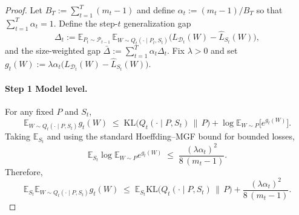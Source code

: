 \documentclass{article}
\theoremstyle{plain}
\theoremstyle{definition}
\theoremstyle{remark}
\begin{document}
\begin{proof}
    


Let $B_T:=\sum_{t=1}^T (m_t-1)$ and define $\alpha_t:=(m_t-1)/B_T$ so that $\sum_{t=1}^T\alpha_t=1$.
Define the step-$t$ generalization gap
\[
\Delta_t
:=\mathbb E_{P_t\sim\mathcal P_{t-1}}\,
\mathbb E_{W\sim Q_t(\cdot\mid P_t,S_t)}
\big(L_{\mathcal D_t}(W)-\hat L_{S_t}(W)\big),
\]
and the size-weighted gap $\bar\Delta:=\sum_{t=1}^T \alpha_t \Delta_t$.
Fix $\lambda>0$ and set
\(
g_t(W):=\lambda\alpha_t\big(L_{\mathcal D_t}(W)-\hat L_{S_t}(W)\big).
\)

\paragraph{Step 1 Model level.}
For any fixed $P$ and $S_t$,
\begin{equation}
\label{eq:dv-w}
\mathbb E_{W\sim Q_t(\cdot\mid P,S_t)} g_t(W)
\;\le\;
\mathrm{KL}\!\big(Q_t(\cdot\mid P,S_t)\,\|\,P\big)
+\log\mathbb E_{W\sim P}\!\big[e^{g_t(W)}\big].
\end{equation}
Taking $\mathbb E_{S_t}$ and using the standard Hoeffding--MGF bound for bounded losses,
\begin{equation}
\label{eq:mgf-mean-gap}
\mathbb E_{S_t}\log\mathbb E_{W\sim P} e^{g_t(W)}
\;\le\; \frac{(\lambda\alpha_t)^2}{8\,(m_t-1)}.
\end{equation}
Therefore,
\begin{equation}
\label{eq:model-step}
\mathbb E_{S_t}\mathbb E_{W\sim Q_t(\cdot\mid P,S_t)} g_t(W)
\;\le\;
\mathbb E_{S_t}\mathrm{KL}\!\big(Q_t(\cdot\mid P,S_t)\,\|\,P\big)
+\frac{(\lambda\alpha_t)^2}{8\,(m_t-1)}.
\end{equation}

\end{proof}
\end{document}

